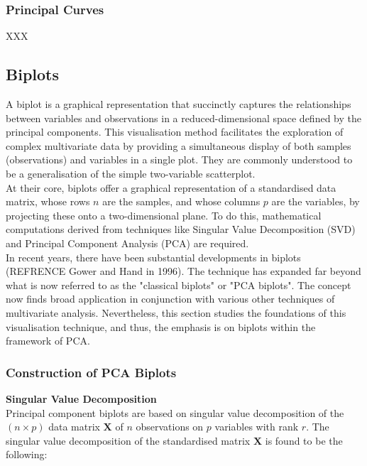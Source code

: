 \documentclass{article}\usepackage[]{graphicx}\usepackage[]{xcolor}
\numberwithin{equation}{section}
\begin{document}
{\subsubsection{Principal Curves}

\noindent XXX

\noindent 


\subsection{Biplots}
\noindent 
A biplot is a graphical representation that succinctly captures the relationships between variables and observations in a reduced-dimensional space defined by the principal components. This visualisation method facilitates the exploration of complex multivariate data by providing a simultaneous display of both samples (observations) and variables in a single plot. They are commonly understood to be a generalisation of the simple two-variable scatterplot.\\

\noindent At their core, biplots offer a graphical representation of a standardised data matrix, whose rows \(n\) are the samples, and whose columns \(p\) are the variables, by projecting these onto a two-dimensional plane. To do this, mathematical computations derived from techniques like Singular Value Decomposition (SVD) and Principal Component Analysis (PCA) are required.\\

\noindent In recent years, there have been substantial developments in biplots (REFRENCE Gower and Hand in 1996). The technique has expanded far beyond what is now referred to as the "classical biplots" or "PCA biplots". The concept now finds broad application in conjunction with various other techniques of multivariate analysis. Nevertheless, this section studies the foundations of this visualisation technique, and thus, the emphasis is on biplots within the framework of PCA.

\subsubsection{Construction of PCA Biplots}

\noindent \textbf{Singular Value Decomposition}\\
\noindent Principal component biplots are based on singular value decomposition of the $(n \times p)$ data matrix $\mathbf{X}$ of $n$ observations on $p$ variables with rank $r$. The singular value decomposition of the standardised matrix $\mathbf{X}$ is found to be the following:

}
\end{document}
